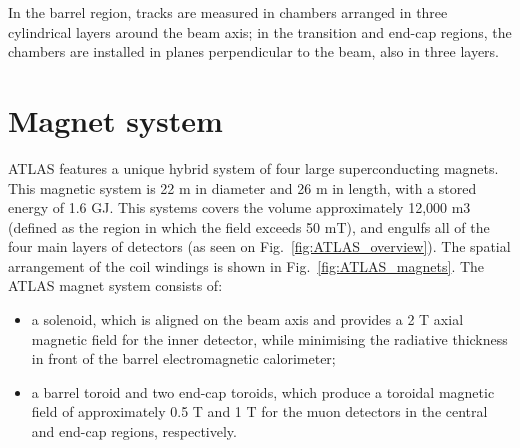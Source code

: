 In the barrel region, tracks are measured in chambers arranged in three cylindrical layers
around the beam axis; in the transition and end-cap regions, the chambers are installed in planes
perpendicular to the beam, also in three layers.


\section{Magnet system}
\label{sec:ATLAS_magnets}

\begin{figure}[htb]
\end{figure}


ATLAS features a unique hybrid system of four large superconducting magnets. This magnetic
system is 22 m in diameter and 26 m in length, with a stored energy of 1.6 GJ. This systems covers the volume approximately 12,000 m3 (defined as the region in which the field exceeds 50 mT), and engulfs all of the four main layers of detectors (as seen on Fig.~\ref{fig:ATLAS_overview}). The spatial arrangement of the coil windings is shown in Fig.~\ref{fig:ATLAS_magnets}. The ATLAS magnet system consists of:

\begin{itemize}
\item a solenoid, which is aligned on the beam axis and provides a 2 T axial magnetic field for the inner detector, while minimising the radiative thickness in front of the
barrel electromagnetic calorimeter;
\item a barrel toroid and two end-cap toroids, which produce a
toroidal magnetic field of approximately 0.5 T and 1 T for the muon detectors in the central
and end-cap regions, respectively.
\end{itemize}

